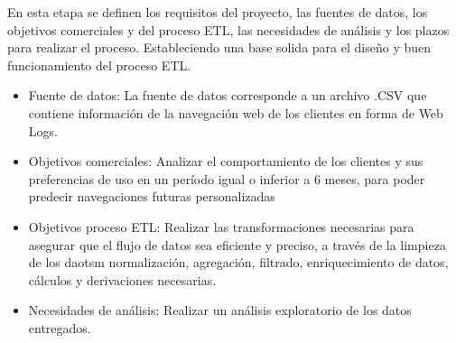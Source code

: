 En esta etapa se definen los requisitos del proyecto, las fuentes de datos, los objetivos comerciales y del proceso ETL, las necesidades de análisis y los plazos para realizar el proceso. Estableciendo una base solida para el diseño y buen funcionamiento del proceso ETL.
\begin{itemize}
    \item Fuente de datos: La fuente de datos corresponde a un archivo .CSV que contiene información de la navegación web de los clientes en forma de Web Logs.
    \item Objetivos comerciales: Analizar el comportamiento de los clientes y sus preferencias de uso en un período igual o inferior a 6 meses, para poder predecir navegaciones futuras personalizadas
    \item Objetivos proceso ETL: Realizar las transformaciones necesarias para asegurar que el flujo de datos sea eficiente y preciso, a través de la limpieza de los daotsm normalización, agregación, filtrado, enriquecimiento de datos, cálculos y derivaciones necesarias.
    \item Necesidades de análisis: Realizar un análisis exploratorio de los datos entregados.
\end{itemize}
